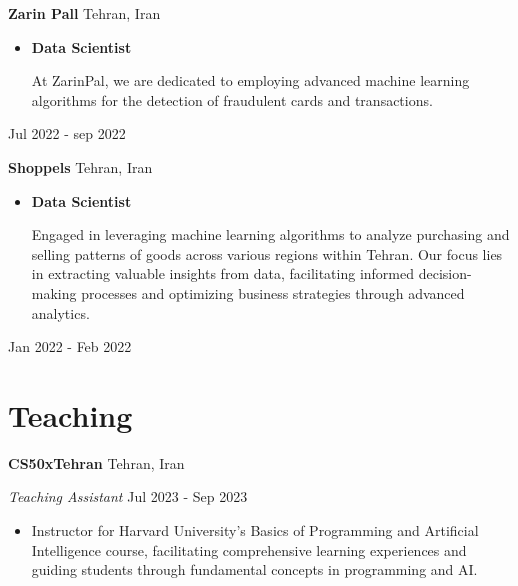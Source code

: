 \documentclass[a4paper,9pt]{extarticle}
\begin{document}
\noindent

\textbf{Zarin Pall} \hfill Tehran, Iran\\ %
\begin{itemize}

\item \textbf{Data Scientist} 

At ZarinPal, we are dedicated to employing advanced machine learning algorithms for the detection of fraudulent cards and transactions.
\end{itemize}\hfill Jul 2022 - sep 2022 %
\begin{itemize}
\end{itemize}




\noindent

\textbf{Shoppels} \hfill Tehran, Iran\\ %
\begin{itemize}

\item \textbf{Data Scientist} 

Engaged in leveraging machine learning algorithms to analyze purchasing and selling patterns of goods across various regions within Tehran. Our focus lies in extracting valuable insights from data, facilitating informed decision-making processes and optimizing business strategies through advanced analytics.
\end{itemize}\hfill Jan 2022 - Feb 2022 %
\begin{itemize}
\end{itemize}

\section*{Teaching}
\noindent
\textbf{CS50xTehran} \hfill Tehran, Iran

\textit{Teaching Assistant} \hfill Jul 2023 - Sep 2023  %
\begin{itemize}
    \item Instructor for Harvard University's Basics of Programming and Artificial Intelligence course, facilitating comprehensive learning experiences and guiding students through fundamental concepts in programming and AI. %
\end{itemize}
\end{document}
